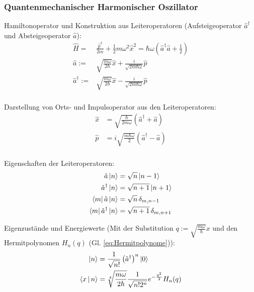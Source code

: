 \documentclass[11pt]{article}
\numberwithin{equation}{section}
\begin{document}
      \subsubsection{Quantenmechanischer Harmonischer Oszillator}
        Hamiltonoperator und Konstruktion aus Leiteroperatoren (Aufsteigeoperator $\hat{a}^\dagger$ und Absteigeoperator $\hat{a}$):
        \begin{equation}
          \begin{aligned}
            \hat{H} =& \frac{\hat{p}^2}{2m} + \frac{1}{2}m\omega^2 \hat{x}^2 = \hbar\omega(\hat{a}^\dagger \hat{a} + \frac{1}{2}) \\
            \hat{a} :=& \sqrt{\frac{m\omega}{2\hbar}}\hat{x} + \frac{i}{\sqrt{2m\hbar\omega}}\hat{p} \\
            \hat{a}^\dagger :=& \sqrt{\frac{m\omega}{2\hbar}}\hat{x} - \frac{i}{\sqrt{2m\hbar\omega}}\hat{p} \\
          \end{aligned}
        \end{equation}

        Darstellung von Orts- und Impulsoperator aus den Leiteroperatoren:
        \begin{equation}
          \begin{aligned}
            \hat{x} &= \sqrt{\frac{\hbar}{2m\omega}}\left(\hat{a}^\dagger + \hat{a} \right) \\
            \hat{p} &= i\sqrt{\frac{m\hbar\omega}{2}}\left(\hat{a}^\dagger - \hat{a} \right) \\
          \end{aligned}
        \end{equation}

        Eigenschaften der Leiteroperatoren:
        \begin{equation}
          \begin{aligned}
            \hat{a}\Ket{n} &= \sqrt{n}\Ket{n-1} \\
            \hat{a}^\dagger\Ket{n} &= \sqrt{n+1}\Ket{n+1} \\
            \Bra{m}\hat{a}\Ket{n} &= \sqrt{n} \,\delta_{m,n-1} \\
            \Bra{m}\hat{a}^\dagger\Ket{n} &= \sqrt{n+1} \,\delta_{m,n+1} \\
          \end{aligned}
        \end{equation}

        Eigenzustände und Energiewerte (Mit der Substitution $q:=\sqrt{\frac{m\omega}{\hbar}}x$ und den Hermitpolynomen $H_n(q)$ (Gl. \ref{eq:Hermitpolynome})):
        \begin{equation}
          \begin{aligned}
            \Ket{n} &= \frac{1}{\sqrt{n!}}\left(\hat{a}^\dagger\right)^n\Ket{0} \\
            \Braket{x|n} &= \sqrt[4]{\frac{m\omega}{2\hbar}} \frac{1}{\sqrt{n! 2^n}} e^{-\frac{q^2}{2}} H_n(q) \\
          \end{aligned}
        \end{equation}
\end{document}
